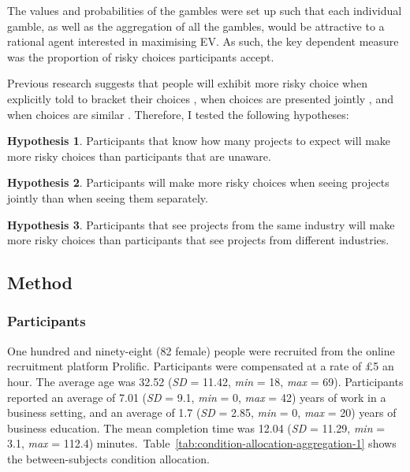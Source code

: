 \documentclass[a4paper, nobind, dvipsnames]{templates/ociamthesis}
\theoremstyle{definition}
\theoremstyle{definition}
\theoremstyle{definition}
\theoremstyle{definition}
\newtheorem{hypothesis}{Hypothesis}[chapter]
\theoremstyle{remark}
\begin{document}
The values and probabilities of the gambles were set up such that each
individual gamble, as well as the aggregation of all the gambles, would be
attractive to a rational agent interested in maximising EV. As such, the key
dependent measure was the proportion of risky choices participants accept.

Previous research suggests that people will exhibit more risky choice when
explicitly told to bracket their choices \autocite{sokolhessner2009,sokolhessner2012},
when choices are presented jointly \autocites[e.g.,][]{moher2010,hsee1999}, and when
choices are similar \autocites[e.g.,][]{dekay2005,markman1995}. Therefore, I tested the
following hypotheses:

\begin{hypothesis}
\protect\hypertarget{hyp:awareness-aggregation-1}{}{\label{hyp:awareness-aggregation-1} }Participants that know how many projects to expect will make more risky choices
than participants that are unaware.
\end{hypothesis}

\begin{hypothesis}
\protect\hypertarget{hyp:presentation-aggregation-1}{}{\label{hyp:presentation-aggregation-1} }Participants will make more risky choices when seeing projects jointly than when
seeing them separately.
\end{hypothesis}

\begin{hypothesis}
\protect\hypertarget{hyp:similarity-aggregation-1}{}{\label{hyp:similarity-aggregation-1} }Participants that see projects from the same industry will make more risky
choices than participants that see projects from different industries.
\end{hypothesis}

\hypertarget{method}{%
\subsection{Method}\label{method}}

\hypertarget{participants}{%
\subsubsection{Participants}\label{participants}}

One hundred and ninety-eight (82 female) people were recruited from the online recruitment platform Prolific. Participants were compensated at a rate of £5 an hour. The average age was 32.52 (\emph{SD} = 11.42, \emph{min} = 18, \emph{max} = 69). Participants reported an average of 7.01 (\emph{SD} = 9.1, \emph{min} = 0, \emph{max} = 42) years of work in a business setting, and an average of 1.7 (\emph{SD} = 2.85, \emph{min} = 0, \emph{max} = 20) years of business education. The mean completion time was 12.04 (\emph{SD} = 11.29, \emph{min} = 3.1, \emph{max} = 112.4) minutes.~Table~\ref{tab:condition-allocation-aggregation-1}
shows the between-subjects condition allocation.
\end{document}
